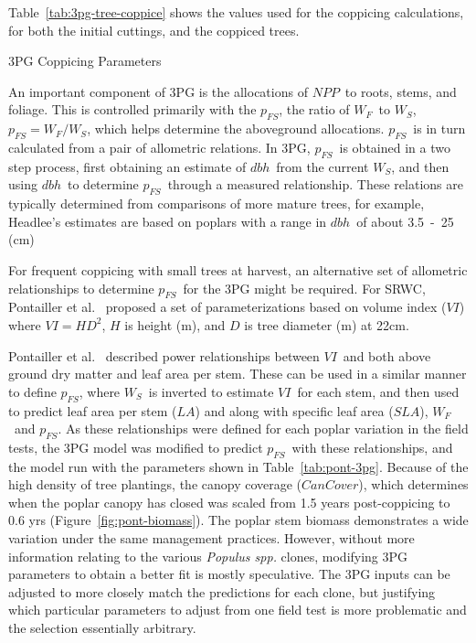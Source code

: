 \documentclass[preprint,12pt]{elsarticle}
\newcommand{\pop}{\textit{Populus spp.} }
\newcommand{\dbh}{\ensuremath{dbh}}
\newcommand{\NPP}{\ensuremath{NPP}}
\newcommand{\SLA}{\ensuremath{SLA}}
\newcommand{\WF}{\ensuremath{W_F}}
\newcommand{\WS}{\ensuremath{W_S}}
\newcommand{\pfs}{\ensuremath{p_{FS}}}
\newcommand{\VI}{\ensuremath{VI}}
\newcommand{\cancover}{\ensuremath{CanCover}}
\newcommand{\LA}{\ensuremath{LA}}
\begin{document}
Table~\ref{tab:3pg-tree-coppice} shows the values used for the
coppicing calculations, for both the initial cuttings, and the
coppiced trees.

\begin{table}%
\caption{3PG Coppicing Parameters}

\label{tab:3pg-tree-coppice}
 \end{table}


An important component of 3PG is the allocations of \NPP~to roots, stems, and
foliage.  This is controlled primarily with the \pfs, the ratio of \WF~to \WS,
$\pfs=\WF/\WS$, which helps determine the aboveground allocations.  \pfs~is in
turn calculated from a pair of allometric relations.  In 3PG, \pfs~is obtained
in a two step process, first obtaining an estimate of \dbh~from the current \WS,
and then using \dbh~to determine \pfs~through a measured relationship.  These
relations are typically determined from comparisons of more mature trees, for
example, Headlee's estimates are based on poplars with a range in \dbh~of about
3.5~-~25 (cm)~\cite{Headlee2012}%

For frequent coppicing with small trees at harvest, an alternative set of
allometric relationships to determine \pfs~for the 3PG might be required. For
\ac{SRWC}, Pontailler et al.~\cite{pontailler97-volume-index} proposed a set of
parameterizations based on volume index (\VI) where $VI = HD^2$, $H$ is height
(m), and $D$ is tree diameter (m) at 22cm.

Pontailler et al.~\cite{pontailler97-volume-index} described power relationships
between \VI~and both above ground dry matter and leaf area per stem. These can
be used in a similar manner to define \pfs, where \WS~is inverted to estimate
\VI~for each stem, and then used to predict leaf area per stem (\LA) and along
with specific leaf area (\SLA), \WF~and \pfs. As these relationships were
defined for each poplar variation in the field tests, the 3PG model was modified
to predict \pfs~with these relationships, and the model run with the parameters
shown in Table~\ref{tab:pont-3pg}.  Because of the high density of tree
plantings, the canopy coverage (\cancover), which determines when the poplar
canopy has closed was scaled from 1.5 years post-coppicing to 0.6 yrs
(Figure~\ref{fig:pont-biomass}). The poplar stem biomass demonstrates a wide
variation under the same management practices. However, without more information
relating to the various \pop clones, modifying 3PG parameters to obtain a better
fit is mostly speculative. The 3PG inputs can be adjusted to more closely match
the predictions for each clone, but justifying which particular parameters to
adjust from one field test is more problematic and the selection essentially
arbitrary.
\end{document}

